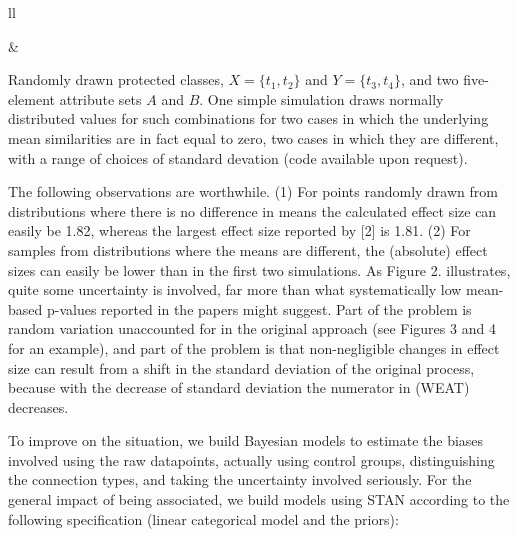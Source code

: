\documentclass[12pt,dvipsnames,enabledeprecatedfontcommands]{scrartcl}
\begin{document}
\begin{tabular}{ll}
\begin{minipage}[c]{0.35\linewidth}
\end{minipage}& \begin{minipage}[c]{0.6\linewidth}
Randomly drawn protected classes, $X=\{t_1,t_2\}$ and $Y=\{t_3,t_4\}$, and two five-element attribute sets $A$ and $B$. One simple simulation draws normally distributed values for such combinations for two cases in which the underlying mean similarities are in fact equal to zero, two cases in which they are different, with a range of choices of standard devation  (code available upon request).
\end{minipage}
\end{tabular}

\vspace{1mm}

The following observations are worthwhile. (1) For points randomly drawn
from distributions where there is no difference in means the calculated
effect size can easily be 1.82, whereas the largest effect size reported
by {[}2{]} is 1.81. (2) For samples from distributions where the means
are different, the (absolute) effect sizes can easily be lower than in
the first two simulations. As Figure 2. illustrates, quite some
uncertainty is involved, far more than what systematically low
mean-based p-values reported in the papers might suggest. Part of the
problem is random variation unaccounted for in the original approach
(see Figures 3 and 4 for an example), and part of the problem is that
non-negligible changes in effect size can result from a shift in the
standard deviation of the original process, because with the decrease of
standard deviation the numerator in (WEAT) decreases.

To improve on the situation, we build Bayesian models to estimate the
biases involved using the raw datapoints, actually using control groups,
distinguishing the connection types, and taking the uncertainty involved
seriously. For the general impact of being associated, we build models
using STAN according to the following specification (linear categorical
model and the priors):
\end{document}
